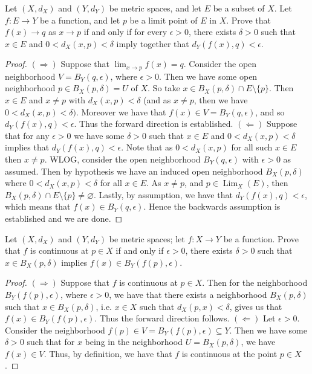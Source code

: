 \documentclass[oneside]{amsart}
\theoremstyle{definition}
\DeclareMathOperator{\Lim}{Lim}
\begin{document}
  \begin{tcolorbox}[colback=black!5!white,colframe=black!75!black,title= Chapter 5; $\S 1.1$: Exercise $1.1.$]  Let $(X, d_X)$ and $(Y, d_Y)$ be metric spaces, and let $E$ be a subset of $X$. Let $f \colon  E \to  Y$ be a function, and let $p$ be a limit point of $E$ in $X$. Prove that $f(x) \to q$ as $x \to p$ if and only if for every $\epsilon > 0$, there exists $\delta > 0$ such that $x \in E$ and $0 < d_X(x,p) < \delta$ imply together that $d_Y (f(x),q) < \epsilon$.
\tcblower 
\begin{proof} $(\Rightarrow )$ Suppose that $\lim_{x \to p} f(x) = q$. Consider the open neighborhood $V = B_Y(q, \epsilon)$, where $\epsilon > 0$. Then we have some open neighborhood $p \in B_X(p, \delta) = U$ of $X$. So take $x \in B_X(p, \delta) \cap E \setminus \{ p \}$. Then $x \in E$ and $x \neq p$ with $d_X(x,p) < \delta$ (and as $x \neq p$, then we have $0 < d_X(x,p) < \delta )$. Moreover we have that $f(x) \in V = B_Y(q, \epsilon)$, and so $d_Y(f(x), q) < \epsilon$. Thus the forward direction is established. $(\Leftarrow)$ Suppose that for any $\epsilon > 0$ we have some $\delta > 0$ such that $x \in E$ and $0 < d_X(x,p) < \delta$ implies that $d_Y (f(x), q) < \epsilon$. Note that as $0 < d_X(x,p)$ for all such $x \in E$ then $x \neq p$. WLOG, consider the open neighborhood $B_Y(q, \epsilon)$ with $\epsilon > 0$ as assumed. Then by hypothesis we have an induced open neighborhood $B_X(p, \delta)$ where $0 < d_X(x,p) < \delta$ for all $x \in E$. As $x \neq p$, and $p \in \Lim_X(E)$, then $B_X(p, \delta) \cap E \setminus \{ p \} \neq \varnothing$. Lastly, by assumption, we have that $d_Y(f(x), q) < \epsilon$, which means that $f(x) \in B_Y(q, \epsilon)$. Hence the backwards assumption is established and we are done.
\end{proof}
\end{tcolorbox}



  \begin{tcolorbox}[colback=black!5!white,colframe=black!75!black,title= Chapter 5; $\S 2.1$: Exercise $2.1.$]  Let $(X, d_X)$ and $(Y, d_Y)$ be metric spaces; let $f \colon X \to Y$ be a function. Prove that $f$ is continuous at $p \in X$ if and only if $\epsilon > 0$, there exists $\delta > 0$ such that $x \in B_X(p, \delta)$ implies $f(x) \in B_Y(f(p), \epsilon)$.
\tcblower 
\begin{proof} $(\Rightarrow)$ Suppose that $f$ is continuous at $p \in X$. Then for the neighborhood $B_Y(f(p), \epsilon)$, where $\epsilon > 0$, we have that there exists a neighborhood $B_X(p, \delta)$ such that $x \in B_X(p, \delta)$, i.e. $x \in X$ such that $d_X(p,x) < \delta$, gives us that $f(x) \in B_Y(f(p), \epsilon)$. Thus the forward direction follows. $(\Leftarrow)$ Let $\epsilon > 0$. Consider the neighborhood $f(p) \in V = B_Y(f(p), \epsilon) \subseteq Y$. Then we have some $\delta > 0$ such that for $x$ being in the neighborhood $U = B_X(p, \delta)$, we have $f(x) \in V$. Thus, by definition, we have that $f$ is continuous at the point $p \in X$.
\end{proof}
\end{tcolorbox}
\end{document}
